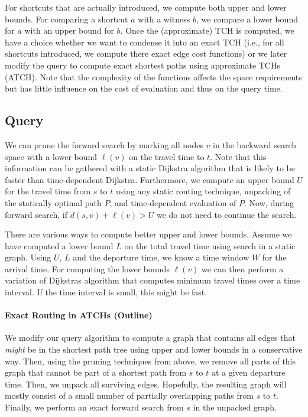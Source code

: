 \documentclass[12pt]{article}
\begin{document}
For shortcuts that are actually introduced, we compute both upper and lower bounds.
For comparing a shortcut $a$ with a witness $b$, we compare a lower bound for $a$ 
with an upper bound for $b$. 
Once the (approximate) TCH is computed, we have a choice whether we 
want to condense it into an exact TCH (i.e., for all shortcuts
introduced, we compute there exact edge cost functions)
or we later modify the query to compute exact shortest paths using
approximate TCHs (ATCH). Note that
the complexity of the functions affects the space requirements but
has little influence on the cost of evaluation and thus on the query time.


\subsection{Query}\label{ss:qrefinements}

We can prune the forward search by marking all nodes $v$ in the 
backward search space with a lower bound $\ell(v)$ on the travel time to $t$.
Note that this information can be gathered with a static Dijkstra algorithm
that is likely to be faster than time-dependent Dijkstra.
Furthermore, we compute an upper bound $U$ for the travel time from $s$ to $t$
using any static routing technique, unpacking of the statically optimal path $P$,
and time-dependent evaluation of $P$.
Now, during forward search, if $d(s,v)+\ell(v) > U$ we do not need to continue
the search. 

There are various ways to compute better upper and lower bounds.
Assume we have computed a lower bound $L$ on the total travel time
using search in a static graph. Using $U$, $L$ and the departure time,
we know a time window $W$ for the arrival time.
For computing the lower bounds $\ell(v)$ we can then perform 
a variation of Dijkstras algorithm that computes minimum
travel times over a time interval. If the time interval is small,
this might be fast.

\paragraph*{Exact Routing in ATCHs (Outline)}
We modify our query algorithm to compute a graph that contains all edges
that \emph{might} be in the shortest path tree using upper and lower bounds
in a conservative way. Then, using the pruning techniques from above,
we remove all parts of this graph that cannot be part of a shortest path
from $s$ to $t$ at a given departure time. 
Then, we unpack all surviving edges. Hopefully, the resulting
graph will mostly consist of a small number of partially overlapping
paths from $s$ to $t$.
Finally,
we perform an exact forward search from $s$ in the unpacked graph.
\end{document}
